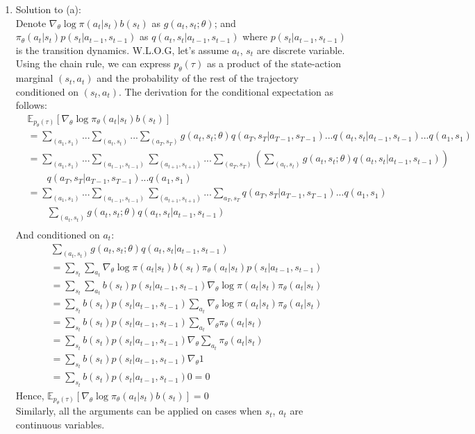 \documentclass[12pt]{article}
\begin{document}
\begin{enumerate}
\item Solution to (a): \\
Denote $\nabla_\theta \log \pi(a_t|s_t)b(s_t)$ as $g(a_t, s_t; \theta)$; and $\pi_\theta(a_t|s_t)p(s_t|a_{t-1}, s_{t-1})$ as $q(a_t, s_t|a_{t-1}, s_{t-1})$ where $p(s_t|a_{t-1}, s_{t-1})$ is the transition dynamics. 
W.L.O.G, let's assume $a_t$, $s_t$ are discrete variable.\\
Using the chain rule, we can express $p_\theta(\tau)$ as a product of the state-action marginal $(s_t, a_t)$ and the probability of the rest of the trajectory conditioned on $(s_t, a_t)$. The derivation for the conditional expectation as follows:
\begin{align*}
	&\mathbb{E}_{p_\theta(\tau)} [\nabla_\theta \log \pi_\theta(a_t|s_t) b(s_{t})] \\
	&=\sum_{(a_1,s_1)}...\sum_{(a_t, s_t)}...\sum_{(a_T, s_T)} g(a_t, s_t; \theta)q(a_T, s_T|a_{T-1}, s_{T-1})...q(a_t, s_t|a_{t-1}, s_{t-1})...q(a_1, s_1) \\
	&= \sum_{(a_1,s_1)}...\sum_{(a_{t-1},s_{t-1})}\sum_{(a_{t+1},s_{t+1})}...\sum_{(a_T, s_T)} (\sum_{(a_t, s_t)}g(a_t, s_t; \theta)q(a_t, s_t|a_{t-1}, s_{t-1}))\\
	&\qquad q(a_T, s_T|a_{T-1}, s_{T-1})...q(a_1, s_1) \\
	&= \sum_{(a_1,s_1)}...\sum_{(a_{t-1},s_{t-1})}\sum_{(a_{t+1},s_{t+1})}...\sum_{a_T, s_T} q(a_T, s_T|a_{T-1}, s_{T-1})...q(a_1, s_1) \\
	&\qquad \sum_{(a_t, s_t)}g(a_t, s_t; \theta)q(a_t, s_t|a_{t-1}, s_{t-1}) \\
\end{align*}
And conditioned on $a_t$:
\begin{align*}
	&\sum_{(a_t, s_t)}g(a_t, s_t; \theta)q(a_t, s_t|a_{t-1}, s_{t-1}) \\
	&= \sum_{s_t} \sum_{a_t} \nabla_\theta \log \pi(a_t|s_t)b(s_t)\pi_\theta(a_t|s_t)p(s_t|a_{t-1}, s_{t-1}) \\
	&= \sum_{s_t} \sum_{a_t} b(s_t)p(s_t|a_{t-1}, s_{t-1})\nabla_\theta \log \pi(a_t|s_t)\pi_\theta(a_t|s_t) \\
	&= \sum_{s_t} b(s_t)p(s_t|a_{t-1}, s_{t-1}) \sum_{a_t}\nabla_\theta \log \pi(a_t|s_t)\pi_\theta(a_t|s_t) \\
	&= \sum_{s_t} b(s_t)p(s_t|a_{t-1}, s_{t-1}) \sum_{a_t} \nabla_\theta \pi_\theta(a_t|s_t) \\
	&= \sum_{s_t} b(s_t)p(s_t|a_{t-1}, s_{t-1}) \nabla_\theta\sum_{a_t} \pi_\theta(a_t|s_t) \\
	&= \sum_{s_t} b(s_t)p(s_t|a_{t-1}, s_{t-1}) \nabla_\theta 1 \\
	&= \sum_{s_t} b(s_t)p(s_t|a_{t-1}, s_{t-1}) 0 = 0
\end{align*}
Hence, $\mathbb{E}_{p_\theta(\tau)} [\nabla_\theta \log \pi_\theta(a_t|s_t) b(s_{t})]=0$ \\
Similarly, all the arguments can be applied on cases when $s_t$, $a_t$ are continuous variables. \\
	\\


\end{enumerate}
\end{document}
